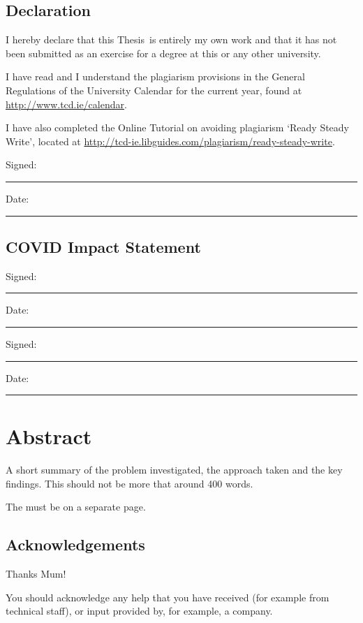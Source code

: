 \documentclass[a4paper,oneside,12pt]{book}
\title{\thesistitle}
\author{\authorname}
\newcommand{\typeofthesis}{Thesis} %
\begin{document}

\doublespacing

\section*{Declaration}
I hereby declare that this \typeofthesis\ is entirely my own work and that it has not been submitted as an exercise for a degree at this or any other university.

I have read and I understand the plagiarism provisions in the General Regulations of the University Calendar for the current year, found at \url{http://www.tcd.ie/calendar}.

I have also completed the Online Tutorial on avoiding plagiarism `Ready Steady Write', located at \url{http://tcd-ie.libguides.com/plagiarism/ready-steady-write}.
\vspace{1cm}

Signed:~\rule{5cm}{0.3pt}\hfill Date:~\rule{5cm}{0.3pt}


\section*{COVID Impact Statement}
\lipsum[1] 

Signed:~\rule{5cm}{0.3pt}\hfill Date:~\rule{5cm}{0.3pt}

Signed:~\rule{5cm}{0.3pt}\hfill Date:~\rule{5cm}{0.3pt}

\newpage
\chapter{Abstract}
A short summary of the problem investigated, the approach taken and the key findings. This should not be more that around 400 words.

The must be on a separate page.

\newpage
\raggedright %

\section*{\Huge{Acknowledgements}}
Thanks Mum!

You should acknowledge any help that you have received (for example from technical staff), or input provided by, for example, a company.
\newpage \tableofcontents
\newpage \listoffigures
\newpage \listoftables
\newpage
\end{document}
